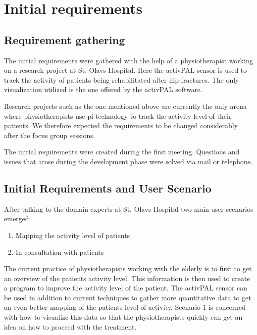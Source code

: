 \chapter{Initial requirements}

\section{Requirement gathering}
The initial requirements were gathered with the help of a physiotherapist working on a research project at St. Olavs Hospital. Here the activPAL sensor is used to track the activity of patients being rehabilitated after hip-fractures. The only visualization utilized is the one offered by the activPAL software.

Research projects such as the one mentioned above are currently the only arena where physiotherapists use \gls{pi} technology to track the activity level of their patients. We therefore expected the requirements to be changed considerably after the focus group sessions. 

The initial requirements were created during the first meeting. Questions and issues that arose during the development phase were solved via mail or telephone.

\section{Initial Requirements and User Scenario}
After talking to the domain experts at St. Olavs Hospital two main user scenarios emerged:
\vspace{-3mm}
\begin{enumerate}[itemsep=0cm, parsep=0cm]
  \item Mapping the activity level of patients
  \item In consultation with patients
\end{enumerate}

The current practice of physiotherapists working with the elderly is to first to get an overview of the patients activity level. This information is then used to create a program to improve the activity level of the patient. The activPAL sensor can be used in addition to current techniques to gather more quantitative data to get an even better mapping of the patients level of activity. Scenario 1 is concerned with how to visualize this data so that the physiotherapists quickly can get an idea on how to proceed with the treatment.

